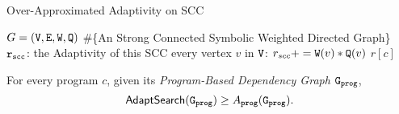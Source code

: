         \begin{algorithm}
          \caption{
          {Over-Approximated Adaptivity on SCC}
          \label{alg:overadp_alg}
          }
          \begin{algorithmic}[1]
          \REQUIRE $G = (\mathtt{V}, \mathtt{E}, \mathtt{W}, \mathtt{Q})$ \#\{An Strong Connected Symbolic Weighted Directed Graph\}
          \\
          $\mathtt{r_{scc}}$: the Adaptivity of this SCC
           every vertex $v$ in $\mathtt{V}$:
          \STATE  \qquad $r_{scc} += \mathtt{W}(v)*\mathtt{Q}(v)$  
          \RETURN $r[c]$
          \end{algorithmic}
          \end{algorithm}
\begin{thm}
    \label{thm:sound_adaptalg}
    For every program $c$, given its \emph{Program-Based Dependency Graph} $\mathtt{{G_{prog}}}$,
     $$\mathsf{AdaptSearch}(\mathtt{{G_{prog}}}) \geq A_{\mathtt{prog}}(\mathtt{{G_{prog}}}).$$
\end{thm}


